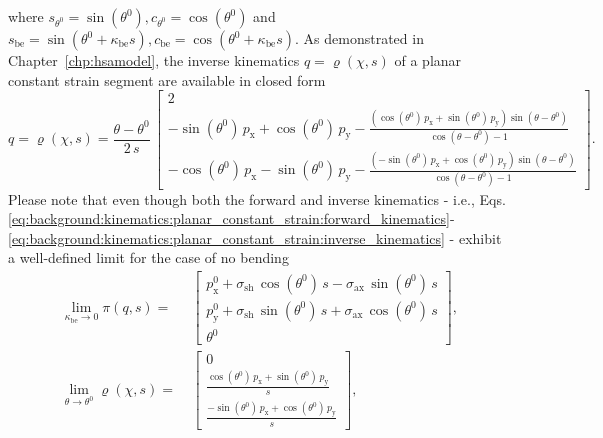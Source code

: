 where $s_{\theta^0} = \sin(\theta^0), c_{\theta^0} = \cos(\theta^0)$ and $s_\mathrm{be} = \sin(\theta^0+\kappa_\mathrm{be} s), c_\mathrm{be} = \cos(\theta^0+\kappa_\mathrm{be} s)$.
As demonstrated in Chapter~\ref{chp:hsamodel}, the inverse kinematics $q = \varrho(\chi,s)$ of a planar constant strain segment are available in closed form
\begin{equation}\label{eq:background:kinematics:planar_constant_strain:inverse_kinematics}
    q = \varrho(\chi,s) = \frac{\theta-\theta^0}{2 \, s} \, \begin{bmatrix}
        2\\
        -\sin(\theta^0) \, p_\mathrm{x} + \cos(\theta^0) \, p_\mathrm{y} - \frac{\left (\cos(\theta^0) \, p_\mathrm{x} + \sin(\theta^0) \,  p_\mathrm{y} \right ) \sin(\theta-\theta^0)}{\cos(\theta-\theta^0)-1}\\
        -\cos(\theta^0) \, p_\mathrm{x} - \sin(\theta^0) \, p_\mathrm{y} - \frac{\left (-\sin(\theta^0) \, p_\mathrm{x} + \cos(\theta^0) \,  p_\mathrm{y} \right ) \sin(\theta-\theta^0)}{\cos(\theta-\theta^0)-1}
    \end{bmatrix}.
\end{equation}
Please note that even though both the forward and inverse kinematics - i.e., Eqs. \eqref{eq:background:kinematics:planar_constant_strain:forward_kinematics}- \eqref{eq:background:kinematics:planar_constant_strain:inverse_kinematics} - exhibit a well-defined limit for the case of no bending
\begin{equation}
\begin{split}
    \lim_{\kappa_\mathrm{be} \to 0} \pi(q,s) =& \: \begin{bmatrix}
        p_\mathrm{x}^0 + \sigma_\mathrm{sh} \, \cos(\theta^0) \, s - \sigma_\mathrm{ax} \, \sin(\theta^0) \, s\\
        p_\mathrm{y}^0 + \sigma_\mathrm{sh} \, \sin(\theta^0) \, s + \sigma_\mathrm{ax} \, \cos(\theta^0) \, s\\
        \theta^0
    \end{bmatrix}, \\
    \lim_{\theta \to \theta^0} \varrho(\chi,s) =& \: \begin{bmatrix}
        0\\
        \frac{\cos(\theta^0) \, p_\mathrm{x} + \sin(\theta^0) \,  p_\mathrm{y}}{s}\\
        \frac{-\sin(\theta^0) \, p_\mathrm{x} + \cos(\theta^0) \,  p_\mathrm{y}}{s}
    \end{bmatrix},\\
\end{split}
\end{equation}
